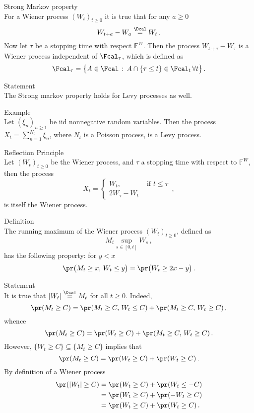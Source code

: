 \noindent Strong Markov property\hfill\\
For a Wiener process $(W_t)_{t\geq 0}$ it is true that for any $a\geq 0$
\[ W_{t+a}-W_a \overset{\Dcal}{=} W_t \,.\]
Now let $\tau$ be a stopping time with respect $\mathbb{F}^W$. Then the process
$W_{t+\tau}-W_\tau$ is a Wiener process independent of $\Fcal_\tau$, which is
defined as
\[ \Fcal_\tau = \bigl\{ A\in \Fcal\,:\,
						A\cap \{\tau\leq t\} \in \Fcal_t\,\forall t \bigr\} \,.\]

\noindent Statement\hfill\\
The Strong markov property holds for Levy processes as well.

\noindent Example\hfill\\
Let $(\xi_n)_{n\geq1}$ be iid nonnegative random variables. Then the process
$X_t = \sum_{n=1}^{N_t} \xi_n$, where $N_t$ is a Poisson process, is a Levy
process.

\noindent Reflection Principle \hfill\\
Let $(W_t)_{t\geq0}$ be the Wiener process, and $\tau$ a stopping time with
respect to $\mathbb{F}^W$, then the process
\[ X_t = \begin{cases}
	W_t, &\text{ if }t\leq \tau\\
	2W_\tau - W_t
\end{cases} \,,\]
is itself the Wiener process.

\noindent Definition\hfill\\
The running maximum of the Wiener process $(W_t)_{t\geq0}$, defined as
\[ M_t \sup_{s\in[0,t]} W_s\,, \]
has the following property: for $y<x$
\[ \pr\bigl(M_t \geq x,\, W_t\leq y \bigr) = \pr\bigl(W_t\geq 2x-y\bigr)\,. \]

\noindent Statement \hfill\\
It is true that $|W_t| \overset{\Dcal}{=} M_t$ for all $t\geq0$.
Indeed,
\[ \pr( M_t \geq C ) = \pr( M_t\geq C,\, W_t\leq C ) + \pr( M_t\geq C,\, W_t\geq C ) \,,\]
whence
\[ \pr( M_t \geq C ) = \pr( W_t\geq C ) + \pr( M_t\geq C,\, W_t\geq C ) \,.\]
However, $\{W_t\geq C\}\subseteq \{M_t\geq C\}$ implies that
\[ \pr( M_t \geq C ) = \pr( W_t\geq C ) + \pr( W_t\geq C ) \,.\]
By definition of a Wiener process 
\begin{align*}
	\pr( |W_t|\geq C )
		&= \pr( W_t\geq C ) + \pr( W_t\leq -C ) \\
		&= \pr( W_t\geq C ) + \pr( -W_t \geq C ) \\
		&= \pr( W_t\geq C ) + \pr( W_t \geq C ) \,.
\end{align*}


